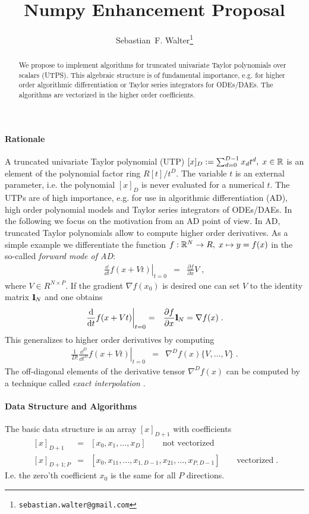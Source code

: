 \documentclass[a4paper,12pt,twoside]{article}
\title{Numpy Enhancement Proposal}
\author{Sebastian~F. Walter\footnote{\texttt{sebastian.walter@gmail.com}}}
\begin{document}
\maketitle

\begin{abstract}
We propose to implement algorithms for truncated univariate Taylor polynomials over scalars (UTPS). This algebraic structure is of fundamental importance, e.g. for higher order algorithmic differentiation or Taylor series integrators for ODEs/DAEs. The algorithms are vectorized in the higher order coefficients.
\end{abstract}
\paragraph{Rationale}
A truncated univariate Taylor polynomial (UTP) $[x]_D := \sum_{d=0}^{D-1} x_d t^d,\; x \in {\mathbb R}$ is an element of the polynomial factor ring $R[t]/t^D$. The variable $t$ is an external parameter, i.e. the polynomial $[x]_D$ is never evaluated for a numerical $t$. The UTPs are of high importance, e.g. for use in algorithmic differentiation (AD), high order polynomial models and Taylor series integrators of ODEs/DAEs. In the following we focus on the motivation from an AD point of view.
In AD, truncated Taylor polynomials allow to compute higher order derivatives. As a simple example we differentiate the function $f: {\mathbb R}^N \rightarrow R, \; x \mapsto y = f(x)$ in the so-called \emph{forward mode of AD}:
\begin{eqnarray}
\left. \frac{\dd}{\dd t} f( x + V t) \right|_{t=0} &=& \frac{\partial f}{\partial x} V \;,
\end{eqnarray}
where $V \in R^{N \times P}$. If the gradient $\nabla f(x_0)$ is desired one can set $V$ to the identity matrix $1 \!\!\! \mathrm I_N$ and one obtains 
\begin{eqnarray}
 \left. \frac{{\rm d}}{{\rm d} t} f( x + V t) \right|_{t=0} &=& \frac{\partial f}{\partial x} 1 \!\!\! \mathrm I_N = \nabla f(x)\;.
\end{eqnarray}
This generalizes to higher order derivatives by computing 
\begin{eqnarray}
\left. \frac{1}{D!}\frac{\dd^D}{\dd t^D} f(x + Vt) \right|_{t=0} &=& \nabla^D f(x) \{ V,\dots, V \} \;.
\end{eqnarray}
The off-diagonal elements of the derivative tensor $\nabla^D f(x)$ can be computed by a technique called \emph{exact interpolation} \cite{Griewank2008EDP}.

\paragraph{Data Structure and Algorithms}
The basic data structure is an array $[x]_{D+1}$ with coefficients
\begin{eqnarray*}
\;[x]_{D+1} &=& [x_0, x_1, \dots, x_D] \quad \quad \mbox{not vectorized} \\
\;[x]_{D+1; P} &=& [x_0, x_{11}, \dots, x_{1,D-1}, x_{21}, \dots, x_{P,D-1}] \quad \quad \mbox{vectorized} \;.
\end{eqnarray*}
I.e. the zero'th coefficient $x_0$ is the same for all $P$ directions.
\end{document}
